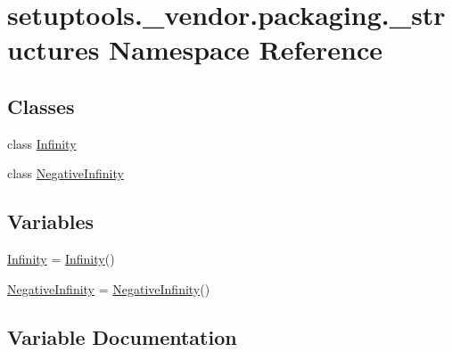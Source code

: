 \hypertarget{namespacesetuptools_1_1__vendor_1_1packaging_1_1__structures}{}\section{setuptools.\+\_\+vendor.\+packaging.\+\_\+structures Namespace Reference}
\label{namespacesetuptools_1_1__vendor_1_1packaging_1_1__structures}
\subsection*{Classes}
\begin{DoxyCompactItemize}
\item 
class \hyperlink{classsetuptools_1_1__vendor_1_1packaging_1_1__structures_1_1_infinity}{Infinity}
\item 
class \hyperlink{classsetuptools_1_1__vendor_1_1packaging_1_1__structures_1_1_negative_infinity}{Negative\+Infinity}
\end{DoxyCompactItemize}
\subsection*{Variables}
\begin{DoxyCompactItemize}
\item 
\hyperlink{namespacesetuptools_1_1__vendor_1_1packaging_1_1__structures_aa94d722d0d1d33108667fb0270c188a6}{Infinity} = \hyperlink{classsetuptools_1_1__vendor_1_1packaging_1_1__structures_1_1_infinity}{Infinity}()
\item 
\hyperlink{namespacesetuptools_1_1__vendor_1_1packaging_1_1__structures_a3399602e5eb96fe48e27cff9be686e4c}{Negative\+Infinity} = \hyperlink{classsetuptools_1_1__vendor_1_1packaging_1_1__structures_1_1_negative_infinity}{Negative\+Infinity}()
\end{DoxyCompactItemize}


\subsection{Variable Documentation}
\mbox{\label{namespacesetuptools_1_1__vendor_1_1packaging_1_1__structures_aa94d722d0d1d33108667fb0270c188a6}} 
